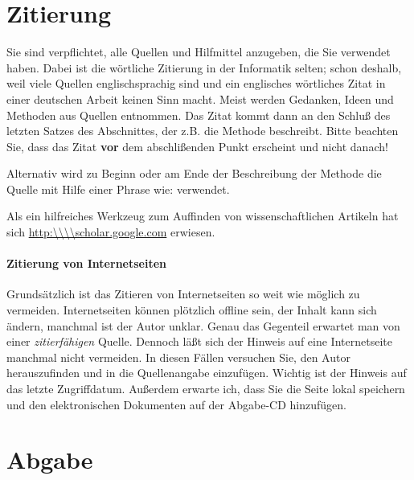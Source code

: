 \section{Zitierung}\label{zitierung}

Sie sind verpflichtet, alle Quellen und Hilfmittel anzugeben, die Sie verwendet haben.
Dabei ist die wörtliche Zitierung in der Informatik selten; schon deshalb, weil viele Quellen englischsprachig sind und ein englisches wörtliches Zitat in einer deutschen Arbeit keinen Sinn macht.
Meist werden Gedanken, Ideen und Methoden aus Quellen entnommen.
Das Zitat kommt dann an den Schluß des letzten Satzes des Abschnittes, der z.B. die Methode beschreibt.
Bitte beachten Sie, dass das Zitat \textbf{vor} dem abschlißenden Punkt erscheint und nicht danach!

Alternativ wird zu Beginn oder am Ende der Beschreibung der Methode die Quelle mit Hilfe einer Phrase wie:
verwendet.

Als ein hilfreiches Werkzeug zum Auffinden von wissenschaftlichen Artikeln hat sich \url{http:\\\\scholar.google.com} erwiesen.

\paragraph{Zitierung von Internetseiten}
Grundsätzlich ist das Zitieren von Internetseiten so weit wie möglich zu vermeiden.
Internetseiten können plötzlich offline sein, der Inhalt kann sich ändern, manchmal ist der Autor unklar.
Genau das Gegenteil erwartet man von einer \emph{zitierfähigen} Quelle.
Dennoch läßt sich der Hinweis auf eine Internetseite manchmal nicht vermeiden.
In diesen Fällen versuchen Sie, den Autor herauszufinden und in die Quellenangabe einzufügen.
Wichtig ist der Hinweis auf das letzte Zugriffdatum.
Außerdem erwarte ich, dass Sie die Seite lokal speichern und den elektronischen Dokumenten auf der Abgabe-CD hinzufügen.

\section{Abgabe}
\label{abgabe}

